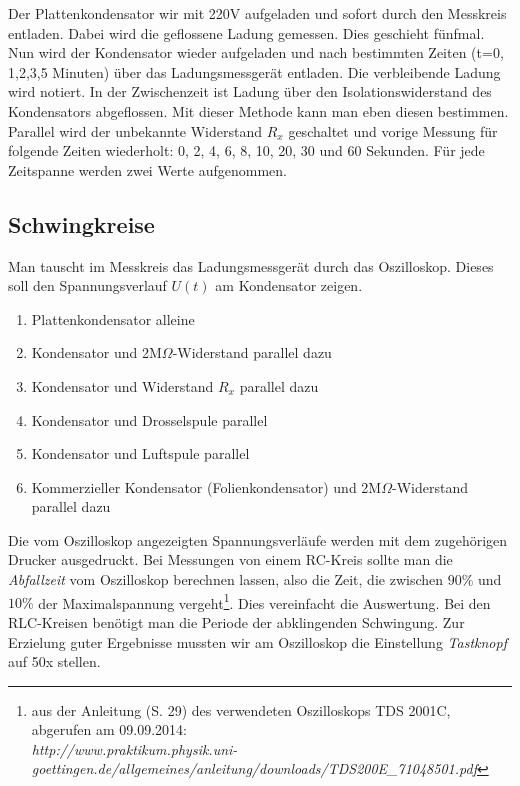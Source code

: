 \documentclass[12pt,a4paper,titlepage,headinclude,bibtotoc]{scrartcl}
\begin{document}
Der  Plattenkondensator wir mit 220V aufgeladen und sofort durch den Messkreis entladen.
Dabei wird die geflossene Ladung gemessen.
Dies geschieht fünfmal.\\
Nun wird der Kondensator wieder aufgeladen und nach bestimmten Zeiten (t=0, 1,2,3,5 Minuten) über das Ladungsmessgerät entladen.
Die verbleibende Ladung wird notiert.
In der Zwischenzeit ist Ladung über den Isolationswiderstand des Kondensators abgeflossen.
Mit dieser Methode kann man eben diesen bestimmen.\\
Parallel wird der unbekannte Widerstand $R_x$ geschaltet und vorige Messung für folgende Zeiten wiederholt: 0, 2, 4, 6, 8, 10, 20, 30 und 60 Sekunden.
Für jede Zeitspanne werden zwei Werte aufgenommen.

\subsection{Schwingkreise}
Man tauscht im Messkreis das Ladungsmessgerät durch das Oszilloskop.
Dieses soll den Spannungsverlauf $U(t)$ am Kondensator zeigen.
\begin{enumerate}
	\item Plattenkondensator alleine
	\item Kondensator und 2M$\Omega$-Widerstand parallel dazu
	\item Kondensator und Widerstand $R_x$ parallel dazu
	\item Kondensator und Drosselspule parallel
	\item Kondensator und Luftspule parallel
	\item Kommerzieller Kondensator (Folienkondensator) und 2M$\Omega$-Widerstand parallel dazu	
\end{enumerate}
Die vom Oszilloskop angezeigten Spannungsverläufe werden mit dem zugehörigen Drucker ausgedruckt.
Bei Messungen von einem RC-Kreis sollte man die \emph{Abfallzeit} vom Oszilloskop berechnen lassen, also die Zeit, die zwischen $90\%$ und $10\%$ der Maximalspannung vergeht\footnote{aus der Anleitung (S. 29) des verwendeten Oszilloskops TDS 2001C, abgerufen am 09.09.2014:\\ 
\emph{http://www.praktikum.physik.uni-goettingen.de/allgemeines/anleitung/downloads/TDS200E\_71048501.pdf}}.
Dies vereinfacht die Auswertung.
Bei den RLC-Kreisen benötigt man die Periode der abklingenden Schwingung. 
Zur Erzielung guter Ergebnisse mussten wir am Oszilloskop die Einstellung \emph{Tastknopf} auf 50x stellen.
\end{document}

